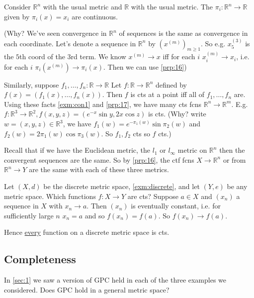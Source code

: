 \begin{example}
    Consider $\mathbb{R}^n$ with the usual metric and $\mathbb{R}$ with the usual metric.
    The  $\pi_i: \mathbb{R}^n \to \mathbb{R}$ given by $\pi_i(x) = x_i$ are continuous. 
    
    (Why? We've seen convergence in $\mathbb{R}^n$ of sequences is the same as convergence in each coordinate. 
    Let's denote a sequence in $\mathbb{R}^n$ by $(x^{(m)})_{m \geq 1}$. So e.g. $x^{(3)}_5$ is the $5$th coord of the $3$rd term.
    We know $x^{(m)} \to x$ iff for each $i$ $x_i^{(m)} \to x_i$, i.e. for each $i$ $\pi_i(x^{(m)}) \to \pi_i(x)$.
    Then we can use \cref{prp:16})

    Similarly, suppose $f_1, \dots, f_n: \mathbb{R} \to \mathbb{R}$
    Let $f: \mathbb{R} \to \mathbb{R}^n$ defined by $f(x) = (f_1(x), \dots, f_n(x))$.
    Then $f$ is cts at a point iff all of $f_1, \dots, f_n$ are.
    Using these facts \cref{exm:con1} and \cref{prp:17}, we have many cts fcns $\mathbb{R}^n \to \mathbb{R}^m$.
    E.g. $f: \mathbb{R}^3 \to \mathbb{R}^2, f(x, y, z) = (e^{-x} \sin y, 2x \cos z)$ is cts. (Why? write $w = (x, y, z) \in \mathbb{R}^3$, we have $f_1(w) = e^{-\pi_1(w)} \sin \pi_2(w)$ and $f_2(w) = 2 \pi_1(w) \cos \pi_3(w)$.
    So $f_1, f_2$ cts so $f$ cts.)
\end{example} 

\begin{example}
    Recall that if we have the Euclidean metric, the $l_1$ or $l_\infty$ metric on $\mathbb{R}^n$ then the convergent sequences are the same.
    So by \cref{prp:16}, the ctf fcns $X \to \mathbb{R}^n$ or from $\mathbb{R}^n \to Y$ are the same with each of these three metrics.
\end{example} 

\begin{example}
    Let $(X, d)$ be the discrete metric space, \cref{exm:discrete}, and let $(Y, e)$ be any metric space.
    Which functions $f : X \to Y$ are cts?
    Suppose $a \in X$ and $(x_n)$ a sequence in $X$ with $x_n \to a$.
    Then $(x_n)$ is eventually constant, i.e. for sufficiently large $n$ $x_n = a$ and so $f(x_n) = f(a)$.
    So $f(x_n) \to f(a)$.

    Hence \underline{every} function on a discrete metric space is cts.
\end{example} 

\subsection{Completeness}
\begin{question}
    In \cref{sec:1} we saw a version of GPC held in each of the three examples we considered. 
    Does GPC hold in a general metric space?
\end{question} 

